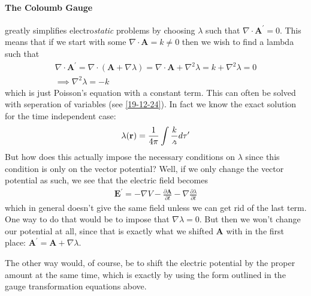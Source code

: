\paragraph{The Coloumb Gauge} greatly simplifies electro\textit{static} problems by choosing \(\lambda \) such that \(\nabla \cdot \mathbf{A}^{\prime}  = 0\). This means that if we start with some \(\nabla \cdot \mathbf{A} = k \neq 0\) then we wish to find a lambda such that \begin{gather*}
    \nabla \cdot \mathbf{A}^{\prime}  = \nabla \cdot \left( \mathbf{A} + \nabla \lambda \right) = \nabla \cdot \mathbf{A} + \nabla ^{2} \lambda = k + \nabla ^{2} \lambda = 0\\
    \implies \nabla ^{2} \lambda = -k
\end{gather*}  
which is just Poisson's equation with a constant term. This can often be solved with seperation of variables (see \ref{19-12-24}). In fact we know the exact solution for the time independent case: \begin{align*}
    \lambda (\mathbf{r}) = \frac{1}{4\pi}  \int \frac{k}{\griffr[2]} d \tau ^{\prime} 
\end{align*}But how does this actually impose the necessary conditions on \(\lambda \) since this condition is only on the vector potential? Well, if we only change the vector potential as such, we see that the electric field becomes \begin{align*}
    \mathbf{E}^{\prime} = - \nabla V - \frac{\partial \mathbf{A}}{\partial t} - \nabla \frac{\partial \lambda }{\partial t} 
\end{align*}
which in general doesn't give the same field unless we can get rid of the last term. One way to do that would be to impose that \(\nabla \lambda = 0\). But then we won't change our potential at all, since that is exactly what we shifted \(\mathbf{A}\) with in the first place: \(\mathbf{A}^{\prime} = \mathbf{A} + \nabla \lambda \). 

The other way would, of course, be to shift the electric potential by the proper amount at the same time, which is exactly by using the form outlined in the gauge transformation equations above.

